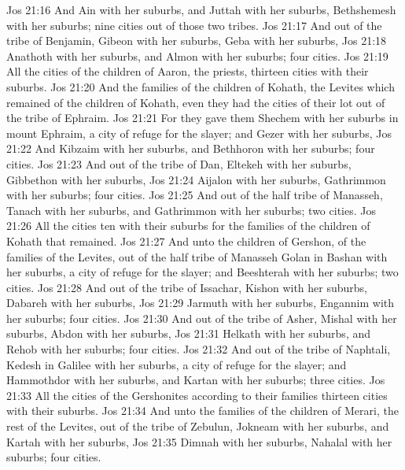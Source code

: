 \vs Jos 21:16 And Ain with her suburbs, and Juttah with her suburbs,  Bethshemesh with her suburbs; nine cities out of those two tribes.
\vs Jos 21:17 And out of the tribe of Benjamin, Gibeon with her suburbs, Geba with her suburbs,
\vs Jos 21:18 Anathoth with her suburbs, and Almon with her suburbs; four cities.
\vs Jos 21:19 All the cities of the children of Aaron, the priests,  thirteen cities with their suburbs.
\vs Jos 21:20 And the families of the children of Kohath, the Levites which remained of the children of Kohath, even they had the cities of their lot out of the tribe of Ephraim.
\vs Jos 21:21 For they gave them Shechem with her suburbs in mount Ephraim,  a city of refuge for the slayer; and Gezer with her suburbs,
\vs Jos 21:22 And Kibzaim with her suburbs, and Bethhoron with her suburbs; four cities.
\vs Jos 21:23 And out of the tribe of Dan, Eltekeh with her suburbs, Gibbethon with her suburbs,
\vs Jos 21:24 Aijalon with her suburbs, Gathrimmon with her suburbs; four cities.
\vs Jos 21:25 And out of the half tribe of Manasseh, Tanach with her suburbs, and Gathrimmon with her suburbs; two cities.
\vs Jos 21:26 All the cities  ten with their suburbs for the families of the children of Kohath that remained.
\vs Jos 21:27 And unto the children of Gershon, of the families of the Levites, out of the  half tribe of Manasseh  Golan in Bashan with her suburbs,  a city of refuge for the slayer; and Beeshterah with her suburbs; two cities.
\vs Jos 21:28 And out of the tribe of Issachar, Kishon with her suburbs, Dabareh with her suburbs,
\vs Jos 21:29 Jarmuth with her suburbs, Engannim with her suburbs; four cities.
\vs Jos 21:30 And out of the tribe of Asher, Mishal with her suburbs, Abdon with her suburbs,
\vs Jos 21:31 Helkath with her suburbs, and Rehob with her suburbs; four cities.
\vs Jos 21:32 And out of the tribe of Naphtali, Kedesh in Galilee with her suburbs,  a city of refuge for the slayer; and Hammothdor with her suburbs, and Kartan with her suburbs; three cities.
\vs Jos 21:33 All the cities of the Gershonites according to their families  thirteen cities with their suburbs.
\vs Jos 21:34 And unto the families of the children of Merari, the rest of the Levites, out of the tribe of Zebulun, Jokneam with her suburbs, and Kartah with her suburbs,
\vs Jos 21:35 Dimnah with her suburbs, Nahalal with her suburbs; four cities.
